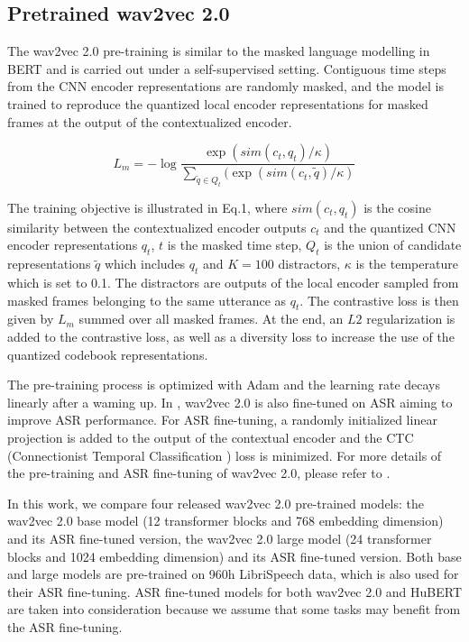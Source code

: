 \documentclass{article}
\begin{document}
 \subsection{Pretrained wav2vec 2.0}
The wav2vec 2.0 pre-training is similar to the masked language modelling in BERT \cite{Bert} and is carried out under a self-supervised setting. Contiguous time steps from the CNN encoder representations are randomly masked, and the model is trained to reproduce the quantized local encoder representations for masked frames at the output of the contextualized encoder.

\begin{equation}
  L_m = -\log \frac{\exp(sim(c_t, q_t)/ \kappa)}
  {\sum_{\tilde{q} \in Q_t}(\exp(sim(c_t, \tilde{q} )/\kappa)}
  \label{eq3}
\end{equation}

The training objective is illustrated in Eq.1, where $sim(c_t, q_t)$ is the cosine similarity between the contextualized encoder outputs $c_t$ and the quantized CNN encoder representations $q_t$, $t$ is the masked time step, $Q_t$ is the union of candidate representations $\tilde{q}$ which includes $q_t$ and $K = 100$ distractors, $\kappa$ is the temperature which is set to 0.1. The distractors are outputs of the local encoder sampled from masked frames belonging to the same utterance as $q_t$. The contrastive loss is then given by $L_m$ summed over all masked frames. At the end, an $L2$ regularization is added to the contrastive loss, as well as a diversity loss to increase the use of the quantized codebook representations.

The pre-training process is optimized with Adam \cite{Adam} and the learning rate decays linearly after a waming up. In \cite{wav2vec2}, wav2vec 2.0 is also fine-tuned on ASR aiming to improve ASR performance. For ASR fine-tuning, a randomly initialized linear projection is added to the output of the contextual encoder and the CTC (Connectionist Temporal Classification \cite{CTC}) loss is minimized. For more details of the pre-training and ASR fine-tuning of wav2vec 2.0, please refer to \cite{wav2vec2}.

In this work, we compare four released wav2vec 2.0 pre-trained models: the wav2vec 2.0 base model (12 transformer blocks and 768 embedding dimension) and its ASR fine-tuned version, the wav2vec 2.0 large model (24 transformer blocks and 1024 embedding dimension) and its ASR fine-tuned version. Both base and large models are pre-trained on 960h LibriSpeech \cite{LibriSpeech} data, which is also used for their ASR fine-tuning. ASR fine-tuned models for both wav2vec 2.0 and HuBERT are taken into consideration because we assume that some tasks may benefit from the ASR fine-tuning.
\end{document}
